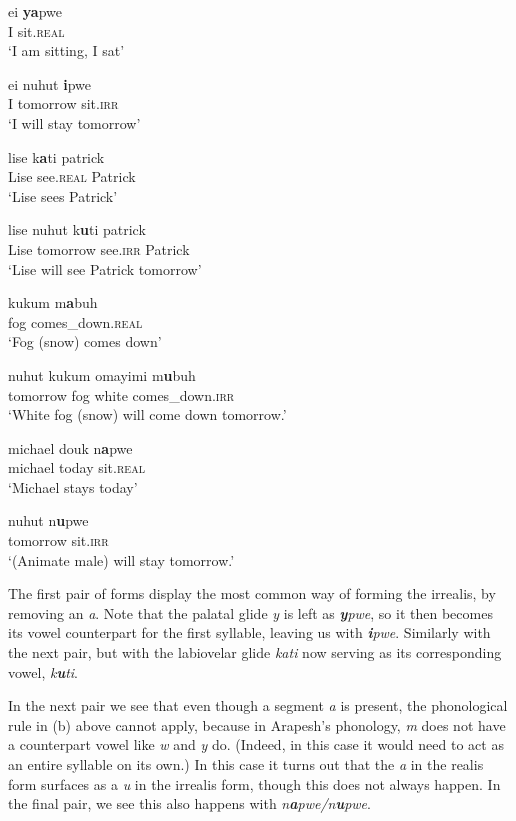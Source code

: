 \documentclass[pdftex,12pt,letterpaper]{article}
\let\ipa\textipa
\def\sw{\ipa{\super w}}
\begin{document}
 \begin{exe}
 \ex
 \gll ei \textbf{ya}pwe \\
 I sit.\textsc{real} \\
 \trans `I am sitting, I sat'

 \ex
 \gll ei nuhut \textbf{i}pwe \\
 I tomorrow sit.\textsc{irr} \\
 \trans `I will stay tomorrow'

 \ex
 \gll lise k\textbf{\sw a}ti patrick \\
 Lise see.\textsc{real} Patrick \\
 \trans `Lise sees Patrick'

 \ex
 \gll lise nuhut k\textbf{u}ti patrick \\
 Lise tomorrow see.\textsc{irr} Patrick \\
 \trans `Lise will see Patrick tomorrow'

 \ex
 \gll kukum m\textbf{a}buh \\
 fog comes\_down.\textsc{real} \\
 \trans `Fog (snow) comes down'

 \ex
 \gll nuhut kukum omayimi m\textbf{u}buh \\
 tomorrow fog white comes\_down.\textsc{irr} \\
 \trans `White fog (snow) will come down tomorrow.'

 \ex
 \gll michael douk n\textbf{a}pwe \\
 michael today sit.\textsc{real} \\
 \trans `Michael stays today'

 \ex
 \gll nuhut n\textbf{u}pwe \\
 tomorrow sit.\textsc{irr} \\
 \trans `(Animate male) will stay tomorrow.'
 \end{exe}

 \noindent The first pair of forms display the most common way of forming the irrealis, by removing an \emph{a}. Note that the palatal glide \emph{y} is left as \emph{\textbf{y}pwe}, so it then becomes its vowel counterpart for the first syllable, leaving us with \emph{\textbf{i}pwe}. Similarly with the next pair, but with the labiovelar glide \emph{k\textbf{\sw}ati} now serving as its corresponding vowel, \emph{k\emph{\textbf{u}}ti}.

 In the next pair we see that even though a segment \emph{a} is present, the phonological rule in (b) above cannot apply, because in Arapesh's phonology, \emph{m} does not have a counterpart vowel like \emph{w} and \emph{y} do. (Indeed, in this case it would need to act as an entire syllable on its own.) In this case it turns out that the \emph{a} in the realis form surfaces as a \emph{u} in the irrealis form, though this does not always happen. In the final pair, we see this also happens with \emph{n\textbf{a}pwe/n\textbf{u}pwe}.
\end{document}
